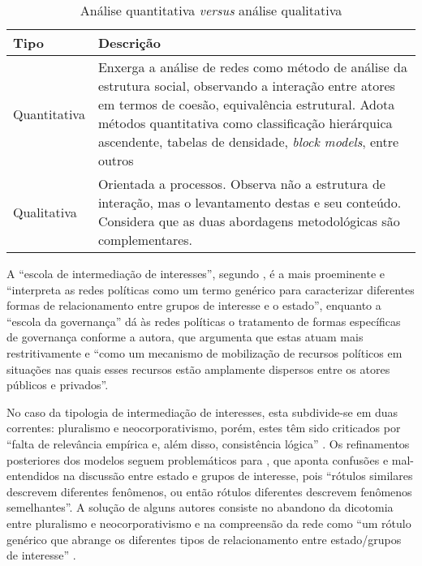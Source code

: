\documentclass[
article,			%
11pt,				%
oneside,			%
a4paper,			%
english,			%
brazil,				%
sumario=tradicional
]{abntex2}
\begin{document}
	\begin{center}
		\begin{longtable}{|l|p{10cm}|}
			\caption{Análise quantitativa \textit{versus} análise qualitativa}
			\label{tab:abordagens}\\
			\hline
			\textbf{Tipo} &
			\textbf{Descrição} \\ \hline
			\endfirsthead
			\endhead
			Quantitativa &
			Enxerga a análise de redes como método de análise da estrutura social, observando a interação entre atores em termos de coesão, equivalência estrutural. Adota métodos quantitativa como classificação hierárquica ascendente, tabelas de densidade, \textit{block models}, entre outros \\ \hline
			Qualitativa &
			Orientada a processos. Observa não a estrutura de interação, mas o levantamento destas e seu conteúdo. Considera que as duas abordagens metodológicas são complementares. \\ \hline
		\end{longtable}
	\end{center}

	A ``escola de intermediação de interesses'', segundo , é a mais proeminente e ``interpreta as redes políticas como um termo genérico para caracterizar diferentes formas de relacionamento entre grupos de interesse e o estado'', enquanto a ``escola da governança'' dá às redes políticas o tratamento de formas específicas de governança conforme a autora, que argumenta que estas atuam mais restritivamente e ``como um mecanismo de mobilização de recursos políticos em situações nas quais esses recursos estão amplamente dispersos entre os atores públicos e privados''.
	
	No caso da tipologia de intermediação de interesses, esta subdivide-se em duas correntes: pluralismo e neocorporativismo, porém, estes têm sido criticados por ``falta de relevância empírica e, além disso, consistência lógica''  . Os refinamentos posteriores dos modelos seguem problemáticos para , que aponta confusões e mal-entendidos na discussão entre estado e grupos de interesse, pois ``rótulos similares descrevem diferentes fenômenos, ou então rótulos diferentes descrevem fenômenos semelhantes''. A solução de alguns autores consiste no abandono da dicotomia entre pluralismo e neocorporativismo e na compreensão da rede como  ``um rótulo genérico que abrange os diferentes tipos de relacionamento entre estado/grupos de interesse'' \cite[p. 225]{borzel2008a}.
	
\end{document}
